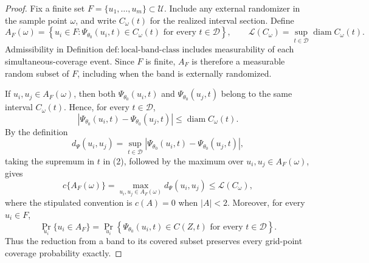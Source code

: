 \documentclass{article}
\begin{document}
\begin{proof}
Fix a finite set \(F=\{u_1,\ldots,u_m\}\subset\mathcal U\).  Include any external randomizer in the sample point \(\omega\), and write \(C_\omega(t)\) for the realized interval section.  Define
\[
 A_F(\omega)
 =\left\{u_i\in F:\Psi_{\theta_0}(u_i,t)\in C_\omega(t)
       \text{ for every }t\in\mathcal D\right\},
 \qquad
 \mathcal L(C_\omega)
 =\sup_{t\in\mathcal D}\operatorname{diam}C_\omega(t).
\tag{1}
\]
Admissibility in Definition \(\mathrm{def:local\mbox{-}band\mbox{-}class}\) includes measurability of each simultaneous-coverage event.  Since \(F\) is finite, \(A_F\) is therefore a measurable random subset of \(F\), including when the band is externally randomized.

If \(u_i,u_j\in A_F(\omega)\), then both \(\Psi_{\theta_0}(u_i,t)\) and \(\Psi_{\theta_0}(u_j,t)\) belong to the same interval \(C_\omega(t)\).  Hence, for every \(t\in\mathcal D\),
\[
 \left|\Psi_{\theta_0}(u_i,t)-\Psi_{\theta_0}(u_j,t)\right|
 \leq \operatorname{diam}C_\omega(t).
\tag{2}
\]
By the definition
\[
 d_\Psi(u_i,u_j)
 =\sup_{t\in\mathcal D}
   \left|\Psi_{\theta_0}(u_i,t)-\Psi_{\theta_0}(u_j,t)\right|,
\]
taking the supremum in \(t\) in (2), followed by the maximum over \(u_i,u_j\in A_F(\omega)\), gives
\[
 c\{A_F(\omega)\}
 =\max_{u_i,u_j\in A_F(\omega)}d_\Psi(u_i,u_j)
 \leq \mathcal L(C_\omega),
\tag{3}
\]
where the stipulated convention is \(c(A)=0\) when \(|A|<2\).  Moreover, for every \(u_i\in F\),
\[
 \Pr_{u_i}\{u_i\in A_F\}
 =\Pr_{u_i}\!\left\{
   \Psi_{\theta_0}(u_i,t)\in C(Z,t)
   \text{ for every }t\in\mathcal D\right\}.
\tag{4}
\]
Thus the reduction from a band to its covered subset preserves every grid-point coverage probability exactly.


\end{proof}
\end{document}
